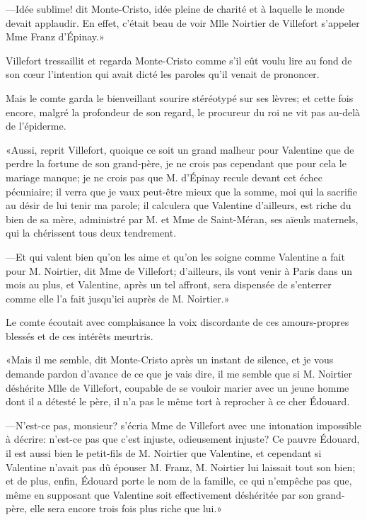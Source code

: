 —Idée sublime! dit Monte-Cristo, idée pleine de charité et à laquelle le monde devait applaudir. En effet, c'était beau de voir Mlle Noirtier de Villefort s'appeler Mme Franz d'Épinay.» 

Villefort tressaillit et regarda Monte-Cristo comme s'il eût voulu lire au fond de son cœur l'intention qui avait dicté les paroles qu'il venait de prononcer. 

Mais le comte garda le bienveillant sourire stéréotypé sur ses lèvres; et cette fois encore, malgré la profondeur de son regard, le procureur du roi ne vit pas au-delà de l'épiderme. 

«Aussi, reprit Villefort, quoique ce soit un grand malheur pour Valentine que de perdre la fortune de son grand-père, je ne crois pas cependant que pour cela le mariage manque; je ne crois pas que M. d'Épinay recule devant cet échec pécuniaire; il verra que je vaux peut-être mieux que la somme, moi qui la sacrifie au désir de lui tenir ma parole; il calculera que Valentine d'ailleurs, est riche du bien de sa mère, administré par M. et Mme de Saint-Méran, ses aïeuls maternels, qui la chérissent tous deux tendrement. 

—Et qui valent bien qu'on les aime et qu'on les soigne comme Valentine a fait pour M. Noirtier, dit Mme de Villefort; d'ailleurs, ils vont venir à Paris dans un mois au plus, et Valentine, après un tel affront, sera dispensée de s'enterrer comme elle l'a fait jusqu'ici auprès de M. Noirtier.» 

Le comte écoutait avec complaisance la voix discordante de ces amours-propres blessés et de ces intérêts meurtris. 

«Mais il me semble, dit Monte-Cristo après un instant de silence, et je vous demande pardon d'avance de ce que je vais dire, il me semble que si M. Noirtier déshérite Mlle de Villefort, coupable de se vouloir marier avec un jeune homme dont il a détesté le père, il n'a pas le même tort à reprocher à ce cher Édouard. 

—N'est-ce pas, monsieur? s'écria Mme de Villefort avec une intonation impossible à décrire: n'est-ce pas que c'est injuste, odieusement injuste? Ce pauvre Édouard, il est aussi bien le petit-fils de M. Noirtier que Valentine, et cependant si Valentine n'avait pas dû épouser M. Franz, M. Noirtier lui laissait tout son bien; et de plus, enfin, Édouard porte le nom de la famille, ce qui n'empêche pas que, même en supposant que Valentine soit effectivement déshéritée par son grand-père, elle sera encore trois fois plus riche que lui.» 

